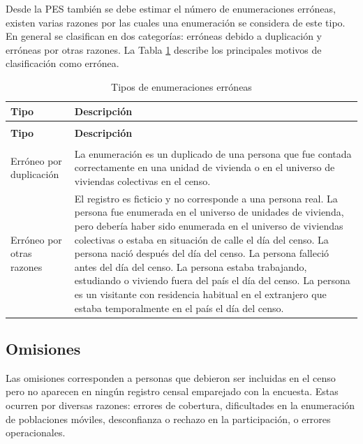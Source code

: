 \documentclass[
  12pt,
]{book}
\begin{document}
Desde la PES también se debe estimar el número de enumeraciones erróneas, existen varias razones por las cuales una enumeración se considera de este tipo. En general se clasifican en dos categorías: erróneas debido a duplicación y erróneas por otras razones. La Tabla \ref{tab:t1} describe los principales motivos de clasificación como errónea.

\begin{longtable}{>{\raggedright\arraybackslash}p{} >{\raggedright\arraybackslash}p{}}
	\caption{Tipos de enumeraciones erróneas}\label{tab:t1}\\
	\toprule
	\textbf{Tipo} & \textbf{Descripción} \\
	\midrule
	\endfirsthead
	
	\multicolumn{2}{c}{\tablename\ \thetable\ -- \textit{Continuación}} \\
	\toprule
	\textbf{Tipo} & \textbf{Descripción} \\
	\midrule
	\endhead
	
	\midrule
	\multicolumn{2}{r}{\textit{Continuado en la siguiente página}} \\
	\endfoot
	
	\bottomrule
	\endlastfoot
	
	Erróneo por duplicación & La enumeración es un duplicado de una persona que fue contada correctamente en una unidad de vivienda o en el universo de viviendas colectivas en el censo. \\[4pt]
	
	Erróneo por otras razones & El registro es ficticio y no corresponde a una persona real. La persona fue enumerada en el universo de unidades de vivienda, pero debería haber sido enumerada en el universo de viviendas colectivas o estaba en situación de calle el día del censo. La persona nació después del día del censo. La persona falleció antes del día del censo. La persona estaba trabajando, estudiando o viviendo fuera del país el día del censo. La persona es un visitante con residencia habitual en el extranjero que estaba temporalmente en el país el día del censo. \\
	
\end{longtable}

\subsection{Omisiones}\label{omisiones}

Las omisiones corresponden a personas que debieron ser incluidas en el censo pero no aparecen en ningún registro censal emparejado con la encuesta. Estas ocurren por diversas razones: errores de cobertura, dificultades en la enumeración de poblaciones móviles, desconfianza o rechazo en la participación, o errores operacionales.
\end{document}

